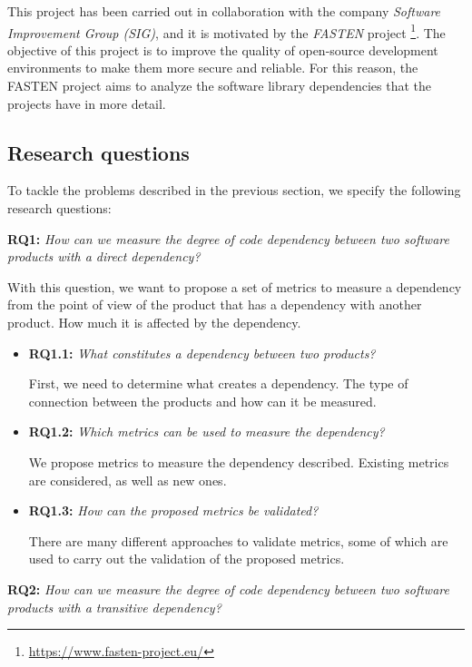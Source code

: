This project has been carried out in collaboration with the company \textit{Software Improvement Group (SIG)}, and it is motivated by the \textit{FASTEN} project \footnote{\url{https://www.fasten-project.eu/}}. The objective of this project is to improve the quality of open-source development environments to make them more secure and reliable. For this reason, the FASTEN project aims to analyze the software library dependencies that the projects have in more detail.

\subsection{Research questions}
To tackle the problems described in the previous section, we specify the following research questions:

\blankl
\textbf{RQ1:} \textit{How can we measure the degree of code dependency between two software products with a direct dependency?}

\blankls
With this question, we want to propose a set of metrics to measure a dependency from the point of view of the product that has a dependency with another product. How much it is affected by the dependency.

\begin{itemize}
  \item \textbf{RQ1.1:} \textit{What constitutes a dependency between two products?}

  First, we need to determine what creates a dependency. The type of connection between the products and how can it be measured.

  \item \textbf{RQ1.2:} \textit{Which metrics can be used to measure the dependency?}

  We propose metrics to measure the dependency described. Existing metrics are considered, as well as new ones.

  \item \textbf{RQ1.3:} \textit{How can the proposed metrics be validated?}

  There are many different approaches to validate metrics, some of which are used to carry out the validation of the proposed metrics.
\end{itemize}

\blankl
\textbf{RQ2:} \textit{How can we measure the degree of code dependency between two software products with a transitive dependency?} 

